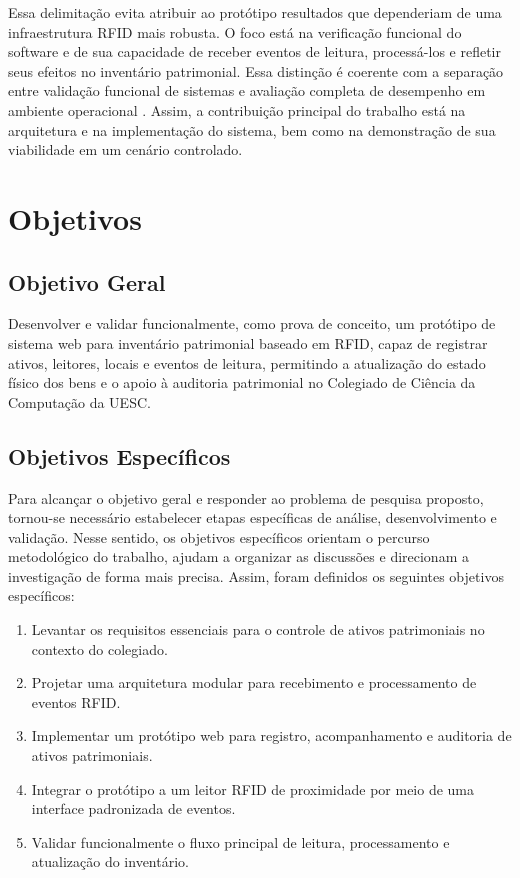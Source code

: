 Essa delimitação evita atribuir ao protótipo resultados que dependeriam de uma infraestrutura RFID mais robusta. O foco está na verificação funcional do software e de sua capacidade de receber eventos de leitura, processá-los e refletir seus efeitos no inventário patrimonial. Essa distinção é coerente com a separação entre validação funcional de sistemas e avaliação completa de desempenho em ambiente operacional \cite{ieee1012}. Assim, a contribuição principal do trabalho está na arquitetura e na implementação do sistema, bem como na demonstração de sua viabilidade em um cenário controlado.

\section{Objetivos}

\subsection{Objetivo Geral}

Desenvolver e validar funcionalmente, como prova de conceito, um protótipo de sistema web para inventário patrimonial baseado em RFID, capaz de registrar ativos, leitores, locais e eventos de leitura, permitindo a atualização do estado físico dos bens e o apoio à auditoria patrimonial no Colegiado de Ciência da Computação da UESC.

\subsection{Objetivos Específicos}

Para alcançar o objetivo geral e responder ao problema de pesquisa proposto, tornou-se necessário estabelecer etapas específicas de análise, desenvolvimento e validação. Nesse sentido, os objetivos específicos orientam o percurso metodológico do trabalho, ajudam a organizar as discussões e direcionam a investigação de forma mais precisa. Assim, foram definidos os seguintes objetivos específicos:

\begin{enumerate}
    \item Levantar os requisitos essenciais para o controle de ativos patrimoniais no contexto do colegiado.
    \item Projetar uma arquitetura modular para recebimento e processamento de eventos RFID.
    \item Implementar um protótipo web para registro, acompanhamento e auditoria de ativos patrimoniais.
    \item Integrar o protótipo a um leitor RFID de proximidade por meio de uma interface padronizada de eventos.
    \item Validar funcionalmente o fluxo principal de leitura, processamento e atualização do inventário.
\end{enumerate}

